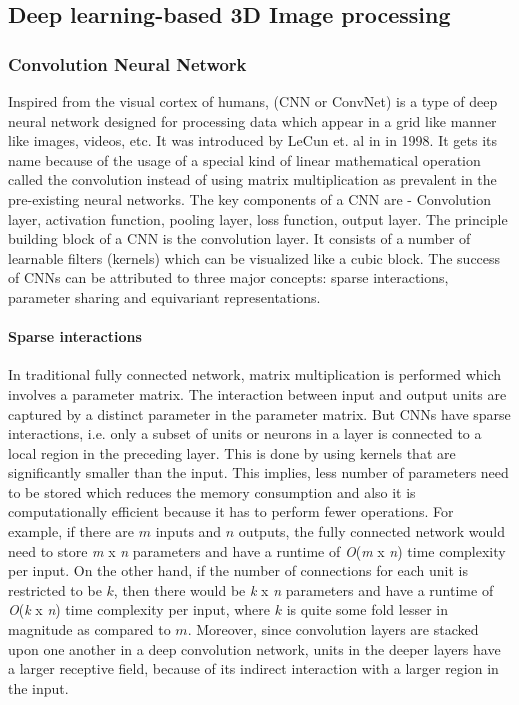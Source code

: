 \subsection{Deep learning-based 3D Image processing}
\subsubsection{Convolution Neural Network}
Inspired from the visual cortex of humans, (\ac{CNN} or ConvNet) is a type of deep neural network designed for processing data which appear in a grid like manner like images, videos, etc.  It was introduced by LeCun et. al in \cite{lecun1998gradient} in 1998.  It gets its name because of the usage of a special kind of linear mathematical operation called the convolution instead of using matrix multiplication as prevalent in the pre-existing neural networks. The key components of a \ac{CNN} are - Convolution layer, activation function, pooling layer, loss function, output layer. The principle building block of a CNN is the convolution layer. It consists of a number of learnable filters (kernels) which can be visualized like a cubic block. The success of \ac{CNN}s can be attributed to three major concepts: sparse interactions, parameter sharing and equivariant representations.\cite{Goodfellow-et-al-2016}
\paragraph{Sparse interactions}
In traditional fully connected network, matrix multiplication is performed which involves a parameter matrix. The interaction between input and output units are captured by a distinct parameter in the parameter matrix. But \ac{CNN}s have sparse interactions, i.e. only a subset of units or neurons in a layer is connected to a local region in the preceding layer. This is done by using kernels that are significantly smaller than the input. This implies, less number of parameters need to be stored which reduces the memory consumption and also it is computationally efficient because it has to perform fewer operations. For example, if there are $m$ inputs and $n$ outputs, the fully connected network would need to store \textit{m} x \textit{n} parameters and have a runtime of \textit{O}(\textit{m} x \textit{n}) time complexity per input. On the other hand, if the number of connections for each unit is restricted to be $k$, then there would be \textit{k} x \textit{n} parameters and have a runtime of \textit{O}(\textit{k} x \textit{n}) time complexity per input, where $k$ is quite some fold lesser in magnitude as compared to $m$. Moreover, since convolution layers are stacked upon one another in a deep convolution network, units in the deeper layers have a larger receptive field, because of its indirect interaction with a larger region in the input.
